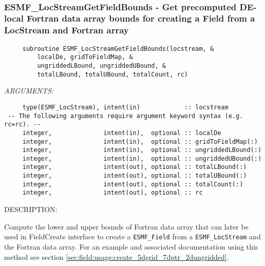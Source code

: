 \mbox{}\hrulefill\ 
 
\subsubsection [ESMF\_LocStreamGetFieldBounds] {ESMF\_LocStreamGetFieldBounds - Get precomputed DE-local Fortran data array bounds for creating a Field from a LocStream and Fortran array}


 
\begin{verbatim}     subroutine ESMF_LocStreamGetFieldBounds(locstream, &
         localDe, gridToFieldMap, &
         ungriddedLBound, ungriddedUBound, &
         totalLBound, totalUBound, totalCount, rc)
     \end{verbatim}{\em ARGUMENTS:}
\begin{verbatim}     type(ESMF_LocStream), intent(in)            :: locstream     
 -- The following arguments require argument keyword syntax (e.g. rc=rc). --
     integer,              intent(in),  optional :: localDe
     integer,              intent(in),  optional :: gridToFieldMap(:)    
     integer,              intent(in),  optional :: ungriddedLBound(:)
     integer,              intent(in),  optional :: ungriddedUBound(:)
     integer,              intent(out), optional :: totalLBound(:)
     integer,              intent(out), optional :: totalUBound(:)
     integer,              intent(out), optional :: totalCount(:)
     integer,              intent(out), optional :: rc     
 \end{verbatim}
{\sf DESCRIPTION:\\ }


   Compute the lower and upper bounds of Fortran data array that can later
   be used in FieldCreate interface to create a {\tt ESMF\_Field} from a
   {\tt ESMF\_LocStream} and the Fortran data array.  For an example and
   associated documentation using this method see section 
   \ref{sec:field:usage:create_5dgrid_7dptr_2dungridded}.
  
